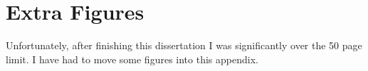 \chapter{Extra Figures}
Unfortunately, after finishing this dissertation I was significantly over the 50 page limit. I have had to move some figures into this appendix.


